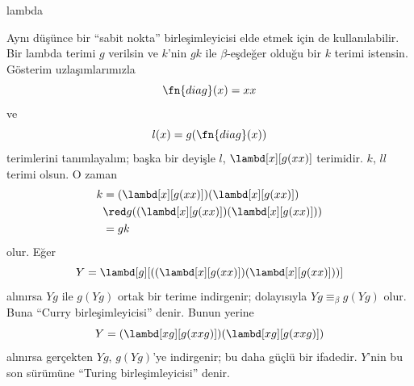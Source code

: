 \documentclass[../../../include/open-logic-section]{subfiles}
\begin{document}
\begin{tagblock}{lambda}
\begin{digress}
Aynı düşünce bir ``sabit nokta'' birleşimleyicisi elde etmek için de
kullanılabilir. Bir lambda terimi $g$ verilsin ve $k$'nin $gk$ ile
$\beta$-eşdeğer olduğu bir $k$ terimi istensin. Gösterim uzlaşımlarımızla
\[
  \fn{diag}(x)=xx
\]
ve
\[
  l(x)=g(\fn{diag}(x))
\]
terimlerini tanımlayalım; başka bir deyişle $l$, $\lambd[x][g(xx)]$
terimidir. $k$, $ll$ terimi olsun. O zaman
\begin{align*}
  k & = (\lambd[x][g(xx)])(\lambd[x][g(xx)])\\
  & \red g((\lambd[x][g(xx)])(\lambd[x][g(xx)]))\\
  & = gk
\end{align*}
olur. Eğer
\[
  Y=\lambd[g][((\lambd[x][g(xx)])(\lambd[x][g(xx)]))]
\]
alınırsa $Yg$ ile $g(Yg)$ ortak bir terime indirgenir; dolayısıyla
$Yg\equiv_\beta g(Yg)$ olur. Buna ``Curry birleşimleyicisi'' denir. Bunun
yerine
\[
  Y=(\lambd[xg][g(xxg)])(\lambd[xg][g(xxg)])
\]
alınırsa gerçekten $Yg$, $g(Yg)$'ye indirgenir; bu daha güçlü bir ifadedir.
$Y$'nin bu son sürümüne ``Turing birleşimleyicisi'' denir.
\end{digress}
\end{tagblock}
\end{document}
